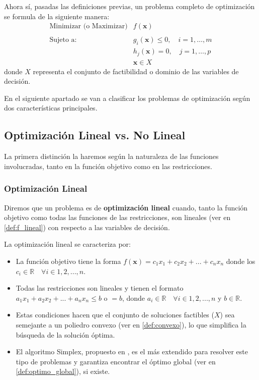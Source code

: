 \documentclass[12pt,a4paper]{book}
\begin{document}
Ahora sí, pasadas las definiciones previas, un problema completo de optimización se formula de la siguiente manera:
$$
\begin{array}{ll}
\text{Minimizar (o Maximizar)} & f(\mathbf{x}) \\ \\
\text{Sujeto a:} & g_i(\mathbf{x}) \le 0, \quad i = 1, \ldots, m \\
& h_j(\mathbf{x}) = 0, \quad j = 1, \ldots, p \\
& \mathbf{x} \in X
\end{array}
$$
donde $X$ representa el conjunto de factibilidad o dominio de las variables de decisión.

En el siguiente apartado se van a clasificar los problemas de optimización según dos características principales.

\subsection{Optimización Lineal vs. No Lineal}

La primera distinción la haremos según la naturaleza de las funciones involucradas, tanto en la función objetivo como en las restricciones.

\subsubsection{Optimización Lineal}
Diremos que un problema es de \textbf{optimización lineal} cuando, tanto la función objetivo como todas las funciones de las restricciones, son lineales (ver en \ref{def:f_lineal}) con respecto a las variables de decisión. 

La optimización lineal se caracteriza por:
\begin{itemize}
    \item La función objetivo tiene la forma $f(\mathbf{x})=c_1x_1+c_2x_2+...+c_nx_n$ donde los $c_i \in \mathbb{R} \quad \forall i \in 1,2,...,n$.
    \item Todas las restricciones son lineales y tienen el formato $a_1x_1+a_2x_2+...+a_nx_n\leq b$ o $=b$, donde $a_i \in \mathbb{R} \quad \forall i \in 1,2,...,n$ y $b\in \mathbb{R}$.
    \item Estas condiciones hacen que el conjunto de soluciones factibles ($X$) sea semejante a un poliedro convexo (ver en \ref{def:convexo}), lo que simplifica la búsqueda de la solución óptima.
    \item El algoritmo Simplex, propuesto en \cite{Dantzig1951}, es el más extendido para resolver este tipo de problemas y garantiza encontrar el óptimo global (ver en \ref{def:optimo_global}), si existe.
\end{itemize}
\end{document}
